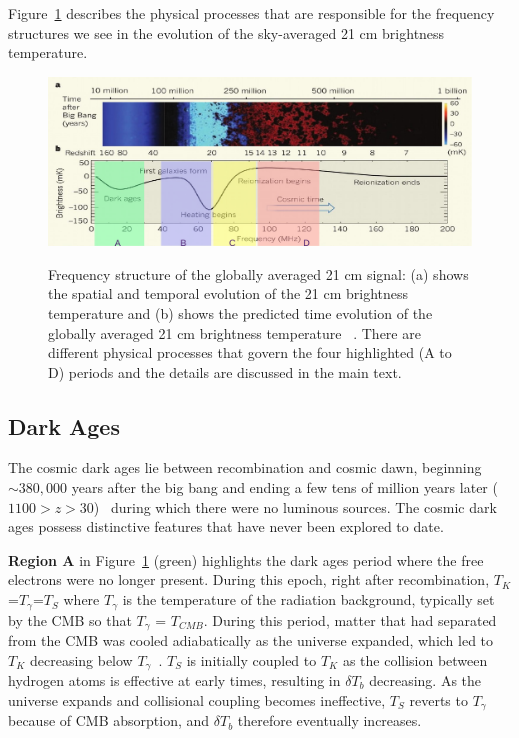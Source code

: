 Figure~\ref{Fig:epochs} describes the physical processes that are responsible for the frequency structures we see in the evolution of the sky-averaged 21 cm brightness temperature.

\begin{figure}
	\begin{center}
		\includegraphics[width=\linewidth]{Figures/epo.pdf}\\
		\caption{Frequency structure of the globally averaged 21 cm signal: (a) shows the spatial and temporal evolution of the 21 cm brightness temperature and (b) shows the predicted time evolution of the globally averaged 21 cm brightness temperature ~\citep{2012RPPh...75h6901P}. There are different physical processes that govern the four highlighted (A to D) periods and the details are discussed in the main text.}			
		\label{Fig:epochs}
	\end{center}
\end{figure}

\subsection{Dark Ages}

The cosmic dark ages lie between recombination and cosmic dawn, beginning $\sim380,000$ years after the big bang and ending a few tens of million years later ($1100 > z > 30$)~\citep{2014arXiv1412.2096J} during which there were no luminous sources. The cosmic dark ages possess distinctive features that have never been explored to date. 

\textbf{Region A} in Figure~\ref{Fig:epochs} (green) highlights the dark ages period where the free electrons were no longer present. During this epoch, right after recombination, $T_K$=$T_\gamma$=$T_S$ where $T_\gamma$ is the temperature of the radiation background, typically set by the CMB so that $T_\gamma$ = $T_{CMB}$. During this period, matter that had separated from the CMB was cooled adiabatically as the universe expanded, which led to $T_K$ decreasing below $T_\gamma$~\citep{2006PhR...433..181F}. $T_S$ is initially coupled to $T_K$ as the collision between hydrogen atoms is effective at early times, resulting in $\delta T_b$ decreasing. As the universe expands and collisional coupling becomes ineffective, $T_S$ reverts to $T_\gamma$ because of CMB absorption, and $\delta T_b$ therefore eventually increases.

